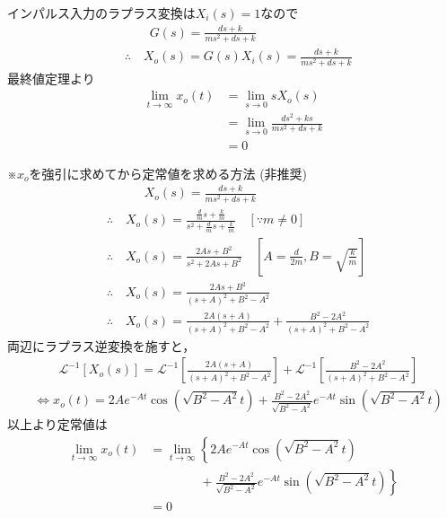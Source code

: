 \documentclass[a4paper,12pt]{article}
\begin{document}
\begin{tcolorbox}[title={5.(3)インパルス入力を印加した際の定常値を求めよ。
    }]
    インパルス入力のラプラス変換は\(X_i(s)=1\)なので
    \vspace{-2mm}
    \begin{align*}
        &\qquad G(s) = \frac{d s + k}{m s^2 + d s + k} \\
        &\therefore \quad X_o(s) = G(s) X_i(s) = \frac{d s + k}{m s^2 + d s + k}
    \end{align*}
    最終値定理より
    \begin{align*}
    \lim_{t \to \infty} x_o(t) &= \lim_{s \to 0} sX_o(s) \\
        &= \lim_{s \to 0} \frac{d s^2 + ks}{m s^2 + d s + k} \\
        &= 0
    \end{align*}
    \begin{tcolorbox}[title={}]
      ※\(x_o\)を強引に求めてから定常値を求める方法 (非推奨)
        \vspace{-2mm}
        \begin{align*}
          &\qquad  \quad X_o(s) = \frac{d s + k}{m s^2 + d s + k}\\
          &\therefore \quad X_o(s) = \frac{\frac{d}{m} s + \frac{k}{m}}{s^2 + \frac{d}{m} s + \frac{k}{m}} \quad \left[\because m \neq 0\right]\\
          &\therefore \quad X_o(s) = \frac{2A s + B^2}{s^2 + 2A s + B^2} \quad \left[A=\frac{d}{2m},B=\sqrt{\frac{k}{m}}\right]\\
          &\therefore \quad X_o(s) = \frac{2A s + B^2}{(s+A)^2+B^2-A^2}\\
          &\therefore \quad X_o(s) = \frac{2A (s+A)}{(s+A)^2+B^2-A^2}
          + \frac{B^2-2A^2}{(s+A)^2+B^2-A^2} 
        \end{align*}
      \quad 両辺にラプラス逆変換を施すと，
        \vspace{-3mm}
        \begin{align*}
        &\qquad \mathcal{L}^{-1} \left[ X_o(s) \right] 
        = \mathcal{L}^{-1} \left[ \frac{2A (s+A)}{(s+A)^2+B^2-A^2}  \right]
        + \mathcal{L}^{-1} \left[ \frac{B^2-2A^2}{(s+A)^2+B^2-A^2}  \right]\\
        &\Leftrightarrow x_o(t) = 2A e^{-At} \cos (\sqrt{B^2-A^2}t) + \frac{B^2-2A^2}{\sqrt{B^2-A^2}} e^{-At} \sin (\sqrt{B^2-A^2}t)
        \end{align*}
        以上より定常値は
        \vspace{-3mm}
        \begin{align*}
        \lim_{t \to \infty} x_o(t) 
            &= \lim_{t \to \infty} \left\{2A e^{-At} \cos (\sqrt{B^2-A^2}t) \right.\\
            &\qquad \qquad + \left.\frac{B^2-2A^2}{\sqrt{B^2-A^2}} e^{-At} \sin (\sqrt{B^2-A^2}t) \right\}\\
            &= 0
        \end{align*}
    \end{tcolorbox}
\end{tcolorbox}
\end{document}
